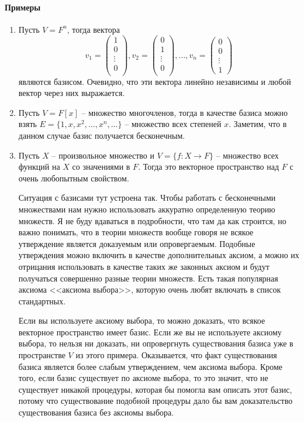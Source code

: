 \paragraph{Примеры}
\begin{enumerate}
\item Пусть $V = F^n$, тогда вектора
\[
v_1 = 
\begin{pmatrix}
{1}\\{0}\\{\vdots}\\{0}\\
\end{pmatrix},
v_2 = 
\begin{pmatrix}
{0}\\{1}\\{\vdots}\\{0}\\
\end{pmatrix},
\ldots,
v_n = 
\begin{pmatrix}
{0}\\{0}\\{\vdots}\\{1}
\end{pmatrix}
\]
являются базисом. Очевидно, что эти вектора линейно независимы и любой вектор через них выражается.

\item Пусть $V = F[x]$ -- множество многочленов, тогда в качестве базиса можно взять $E = \{1,x,x^2, \ldots , x^n,\ldots\}$ -- множество всех степеней $x$. Заметим, что в данном случае базис получается бесконечным.

\item Пусть $X$ -- произвольное множество и $V = \{f\colon X\to F\}$ -- множество всех функций на $X$ со значениями в $F$. Тогда это векторное пространство над $F$ с очень любопытным свойством. 

Ситуация с базисами тут устроена так. Чтобы работать с бесконечными множествами нам нужно использовать аккуратно определенную теорию множеств. Я не буду вдаваться в подробности, что там да как строится, но важно понимать, что в теории множеств вообще говоря не всякое утверждение является доказуемым или опровергаемым. Подобные утверждения можно включить в качестве дополнительных аксиом, а можно их отрицания использовать в качестве таких же законных аксиом и будут получаться совершенно разные теории множеств. Есть такая популярная аксиома <<аксиома выбора>>, которую очень любят включать в список стандартных. 

Если вы используете аксиому выбора, то можно доказать, что всякое векторное пространство имеет базис. Если же вы не используете аксиому выбора, то нельзя ни доказать, ни опровергнуть существования базиса уже в пространстве $V$ из этого примера. Оказывается, что факт существования базиса является более слабым утверждением, чем аксиома выбора. Кроме того, если базис существует по аксиоме выбора, то это значит, что не существует никакой процедуры, которая бы помогла вам описать этот базис, потому что существование подобной процедуры дало бы вам доказательство существования базиса без аксиомы выбора. 
\end{enumerate}


